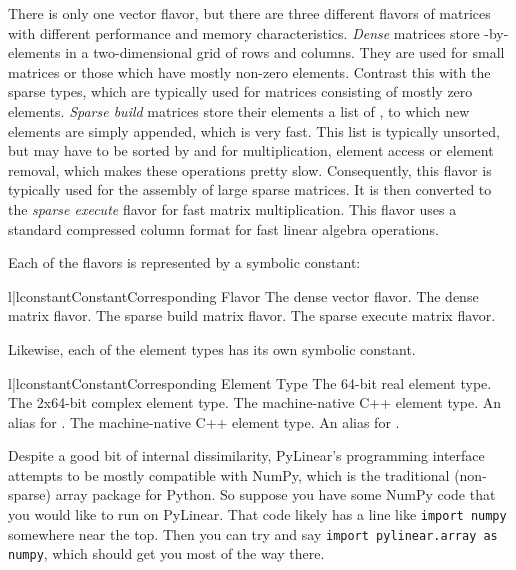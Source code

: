 There is only one vector flavor, but there are three different flavors of
matrices with different performance and memory characteristics. \emph{Dense}
matrices store -by- elements in a two-dimensional grid of 
rows and  columns. They are used for small matrices or those which have
mostly non-zero elements. Contrast this with the sparse types, which are
typically used for matrices consisting of mostly zero elements. \emph{Sparse
build} matrices store their elements a list of , to which
new elements are simply appended, which is very fast. This list is typically
unsorted, but may have to be sorted by  and  for multiplication,
element access or element removal, which makes these operations pretty slow.
Consequently, this flavor is typically used for the assembly of large sparse
matrices. It is then converted to the \emph{sparse execute} flavor for fast
matrix multiplication. This flavor uses a standard compressed column format for
fast linear algebra operations.

Each of the flavors is represented by a symbolic constant:

\begin{tableii}{l|l}{constant}{Constant}{Corresponding Flavor}
         {The dense vector flavor.}
         {The dense matrix flavor.}
         {The sparse build matrix flavor.}
         {The sparse execute matrix flavor.}
\end{tableii}

Likewise, each of the element types has its own symbolic constant.

\begin{tableii}{l|l}{constant}{Constant}{Corresponding Element Type}
         {The 64-bit real element type.}
         {The 2x64-bit complex element type.}
         {The machine-native C++  element type.
          An alias for .}
         {The machine-native C++  
          element type. An alias for .}
\end{tableii}

Despite a good bit of internal dissimilarity, PyLinear's programming interface
attempts to be mostly compatible with NumPy, which is the traditional
(non-sparse) array package for Python. So suppose you have some NumPy code that
you would like to run on PyLinear. That code likely has a line like
\verb|import numpy| somewhere near the top. Then you can try and say
\verb|import pylinear.array as numpy|, which should get you most of the way
there.
